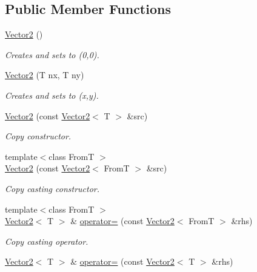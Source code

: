 \subsection*{Public Member Functions}
\begin{DoxyCompactItemize}
\item 
\hyperlink{class_vector2_ae2f1223cb0d664aa73afb789086a4174}{Vector2} ()
\begin{DoxyCompactList}\small\item\em Creates and sets to (0,0). \item\end{DoxyCompactList}\item 
\hyperlink{class_vector2_a73dbb934192bdaffb43f4f472e62d1d7}{Vector2} (T nx, T ny)
\begin{DoxyCompactList}\small\item\em Creates and sets to (x,y). \item\end{DoxyCompactList}\item 
\hyperlink{class_vector2_a6942368710d42c4b66776538a583d6dc}{Vector2} (const \hyperlink{class_vector2}{Vector2}$<$ T $>$ \&src)
\begin{DoxyCompactList}\small\item\em Copy constructor. \item\end{DoxyCompactList}\item 
{\footnotesize template$<$class FromT $>$ }\\\hyperlink{class_vector2_a93286dc1ccd8e1f2deb49668076aa5dc}{Vector2} (const \hyperlink{class_vector2}{Vector2}$<$ FromT $>$ \&src)
\begin{DoxyCompactList}\small\item\em Copy casting constructor. \item\end{DoxyCompactList}\item 
{\footnotesize template$<$class FromT $>$ }\\\hyperlink{class_vector2}{Vector2}$<$ T $>$ \& \hyperlink{class_vector2_aa93d791f8624cf19ea3b2a7eed329b61}{operator=} (const \hyperlink{class_vector2}{Vector2}$<$ FromT $>$ \&rhs)
\begin{DoxyCompactList}\small\item\em Copy casting operator. \item\end{DoxyCompactList}\item 
\hyperlink{class_vector2}{Vector2}$<$ T $>$ \& \hyperlink{class_vector2_a63e1c003cecacae0b26296941b3fe44a}{operator=} (const \hyperlink{class_vector2}{Vector2}$<$ T $>$ \&rhs)

\end{DoxyCompactItemize}

